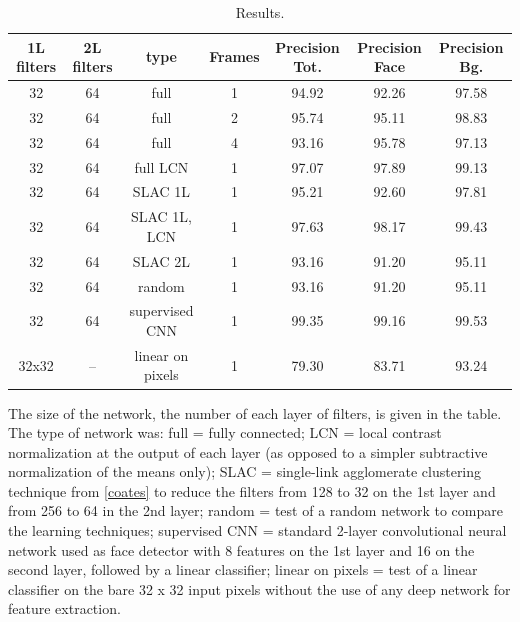 \documentclass{article} %
\begin{document}
\begin{table}[htdp]
\caption{Results.}
\begin{center}
\begin{tabular}{|c|c|c|c|c|c|c|}
\hline\hline
1L filters	& 2L filters	& type	& Frames	& Precision Tot. & Precision Face  & Precision Bg. \\ 
\hline
32 		& 64 		& full				& 1	& 94.92  	& 92.26	& 97.58  \\
32 		& 64 		& full				& 2	& 95.74	& 95.11	& 98.83  \\
32 		& 64 		& full				& 4	& 93.16  	& 95.78	& 97.13  \\
32 		& 64 		& full LCN			& 1	& 97.07 	& 97.89	& 99.13  \\ 
32 		& 64 		& SLAC 1L		& 1	& 95.21  	& 92.60	& 97.81  \\
32 		& 64 		& SLAC 1L, LCN	& 1	& 97.63 	& 98.17	& 99.43  \\ 
32 		& 64 		& SLAC 2L		& 1	& 93.16 	& 91.20	& 95.11  \\ 
32 		& 64 		& random			& 1	& 93.16 	& 91.20	& 95.11  \\ 
32 		& 64 		& supervised CNN	& 1	& 99.35 	& 99.16	& 99.53  \\ 
32x32 	& -- 		& linear on pixels	& 1	& 79.30 	& 83.71	& 93.24  \\ 
\hline\hline
\end{tabular}
\end{center}
\label{table1}
\end{table}


The size of the network, the number of each layer of filters,  is given in the table. The type of network was: full = fully connected; LCN = local contrast normalization at the output of each layer (as opposed to a simpler subtractive normalization of the means only); SLAC = single-link agglomerate clustering technique from \ref{coates} to reduce the filters from 128 to 32 on the 1st layer and from 256 to 64 in the 2nd layer; random = test of a random network to compare the learning techniques; supervised CNN = standard 2-layer convolutional neural network used as face detector with 8 features on the 1st layer and 16 on the second layer, followed by a linear classifier; linear on pixels = test of a linear classifier on the bare 32 x 32 input pixels without the use of any deep network for feature extraction.
\end{document}
